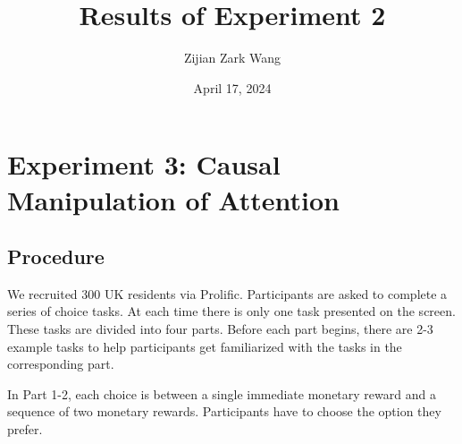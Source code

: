 \documentclass[
  12pt,
]{article}
\title{Results of Experiment 2}
\author{Zijian Zark Wang}
\date{April 17, 2024}
\begin{document}
\maketitle

\hypertarget{experiment-3-causal-manipulation-of-attention}{%
\section{Experiment 3: Causal Manipulation of
Attention}\label{experiment-3-causal-manipulation-of-attention}}

\hypertarget{procedure}{%
\subsection{Procedure}\label{procedure}}

We recruited 300 UK residents via Prolific. Participants are asked to
complete a series of choice tasks. At each time there is only one task
presented on the screen. These tasks are divided into four parts. Before
each part begins, there are 2-3 example tasks to help participants get
familiarized with the tasks in the corresponding part.

In Part 1-2, each choice is between a single immediate monetary reward
and a sequence of two monetary rewards. Participants have to choose the
option they prefer.
\end{document}
